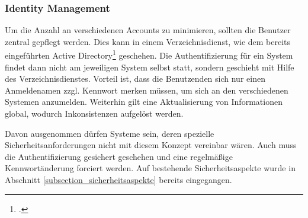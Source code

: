 \subsubsection{Identity Management}
Um die Anzahl an verschiedenen Accounts zu minimieren, sollten die Benutzer zentral gepflegt werden. 
Dies kann in einem Verzeichnisdienst, wie dem bereits eingeführten Active Directory\footcite{gunter_muller_interview}
geschehen. Die Authentifizierung für ein System findet dann nicht am jeweiligen System selbst statt, sondern 
geschieht mit Hilfe des Verzeichnisdienstes. Vorteil ist, dass die Benutzenden sich nur einen Anmeldenamen 
zzgl. Kennwort merken müssen, um sich an den verschiedenen Systemen anzumelden. Weiterhin gilt eine 
Aktualisierung von Informationen global, wodurch Inkonsistenzen aufgelöst werden.

Davon ausgenommen dürfen Systeme sein, deren spezielle Sicherheitsanforderungen nicht mit diesem Konzept 
vereinbar wären. Auch muss die Authentifizierung gesichert geschehen und eine regelmäßige Kennwortänderung 
forciert werden. Auf bestehende Sicherheitsaspekte wurde in Abschnitt \ref{subsection_sicherheitsaspekte} bereits 
eingegangen.

